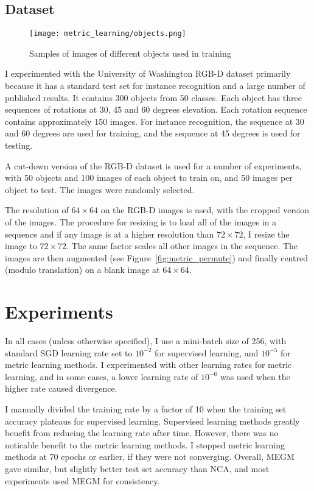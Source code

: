 \subsection {Dataset}

\begin{figure}[h]
\centering
\texttt{[image: metric\_learning/objects.png]}
\caption{Samples of images of different objects used in training}
\label{fig:metric_dataset}
\end{figure}

I experimented with the University of Washington RGB-D dataset primarily because it has a standard test set for instance recognition and a large number of published results. It contains 300 objects from 50 classes. Each object has three sequences of rotations at 30, 45 and 60 degrees elevation. Each rotation sequence contains approximately 150 images. For instance recognition, the sequence at 30 and 60 degrees are used for training, and the sequence at 45 degrees is used for testing. 

A cut-down version of the RGB-D dataset is used for a number of experiments, with 50 objects and 100 images of each object to train on, and 50 images per object to test. The images were randomly selected.

The resolution of $ 64\times64 $ on the RGB-D images is used, with the cropped version of the images. The procedure for resizing is to load all of the images in a sequence and if any image is at a higher resolution than $ 72\times72$, I resize the image to $ 72\times72 $. The same factor scales all other images in the sequence. The images are then augmented (see Figure~\ref{fig:metric_permute}) and finally centred (modulo translation) on a blank image at  $ 64\times64 $.


\section {Experiments}

In all cases (unless otherwise specified), I use a mini-batch size of 256, with standard \gls{SGD} learning rate set to $ 10^{-2} $ for supervised learning, and $ 10^{-5} $ for metric learning methods. I experimented with other learning rates for metric learning, and in some cases, a lower learning rate of $ 10^{-6} $ was used when the higher rate caused divergence.

I manually divided the training rate by a factor of 10 when the training set accuracy plateaus for supervised learning. Supervised learning methods greatly benefit from reducing the learning rate after time. However, there was no noticable benefit to the metric learning methods. I stopped metric learning methods at 70 epochs or earlier, if they were not converging. Overall, \gls{MEGM} gave similar, but slightly better test set accuracy than \gls{NCA}, and most experiments used \gls{MEGM} for consistency.



